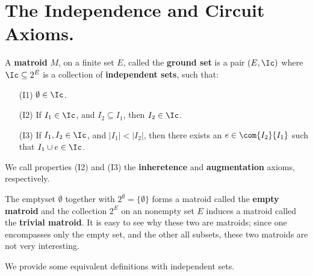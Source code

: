 
\section{The Independence and Circuit Axioms.}

\begin{definition}
    A \textbf{matroid} $M$, on a finite set $E$, called the \textbf{ground set}
    is  a pair $(E,\Ic)$ where $\Ic \subseteq 2^E$ is a collection of
    \textbf{independent sets}, such that:
    \begin{enumerate}
        \item[(I1)] $\emptyset \in \Ic$.

        \item [(I2)] If $I_1 \in \Ic$, and  $I_2 \subseteq I_1$, then  $I_2 \in
            \Ic$.

        \item[(I3)] If $I_1,I_2 \in \Ic$, and  $|I_1|<|I_2|$, then there exists
            an  $e \in \com{{I_2}}{I_1}$ such that $I_1 \cup e \in \Ic$.
    \end{enumerate}
    We call properties (I2) and (I3) the \textbf{inheretence} and
    \textbf{augmentation} axioms, respectively.
\end{definition}

\begin{example}
        The emptyset $\emptyset$ together with $2^\emptyset=\{\emptyset\}$ forms
        a matroid called the \textbf{empty matroid} and the collection $2^E$ on an
        nonempty set $E$ induces a matroid called the \textbf{trivial matroid}.
        It is easy to see why these two are matroids; since one encompasses only
        the empty set, and the other all subsets, these two matroids are not
        very interesting.
\end{example}

We provide some equivalent definitions with independent sets.

